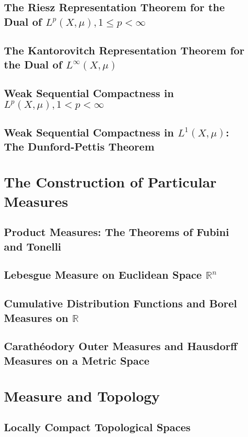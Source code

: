 \documentclass[a4paper,10pt]{book}
\theoremstyle{plain} %
\begin{document}
\section{The Riesz Representation Theorem for the Dual of $L^p(X,\mu),1\le p < \infty$}
\section{The Kantorovitch Representation Theorem for the Dual of $L^\infty(X,\mu)$}
\section{Weak Sequential Compactness in $L^p(X,\mu),1< p < \infty$}
\section{Weak Sequential Compactness in $L^1(X,\mu)$: The Dunford-Pettis Theorem}

\chapter{The Construction of Particular Measures}

\section{Product Measures: The Theorems of Fubini and Tonelli}
\section{Lebesgue Measure on Euclidean Space $\mathbb{R}^n$}
\section{Cumulative Distribution Functions and Borel Measures on $\mathbb{R}$}
\section{Carath\'eodory Outer Measures and Hausdorff Measures on a Metric Space}

\chapter{Measure and Topology}

\section{Locally Compact Topological Spaces}
\end{document}
